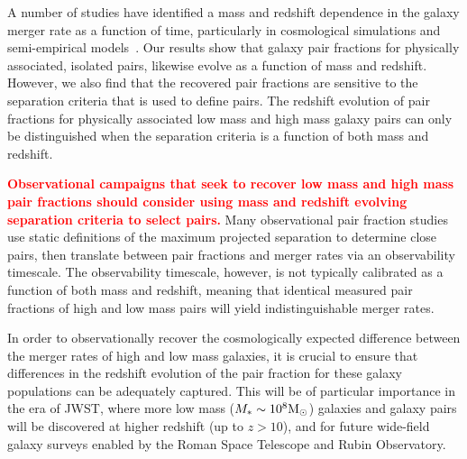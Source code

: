 \documentclass[linenumbers,twocolumn]{aastex631}
\newcommand{\add}[1]{\textcolor{red}{\textbf{#1}}}
\begin{document}
    A number of studies have identified a mass and redshift dependence in the galaxy merger rate as a function of time, particularly in cosmological simulations and semi-empirical models~\cite[see e.g.][]{Stewart2009,Hopkins2010,RG2015}. 
    Our results show that galaxy pair fractions for physically associated, isolated pairs, likewise evolve as a function of mass and redshift. 
    However, we also find that the recovered pair fractions are sensitive to the separation criteria that is used to define pairs.
    The redshift evolution of pair fractions for physically associated low mass and high mass galaxy pairs can only be distinguished when the separation criteria is a function of both mass and redshift.

    \add{Observational campaigns that seek to recover low mass and high mass pair fractions should consider using mass and redshift evolving separation criteria to select pairs.}
    Many observational pair fraction studies use static definitions of the maximum projected separation to determine close pairs, then translate between pair fractions and merger rates via an observability timescale. 
    The observability timescale, however, is not typically calibrated as a function of both mass and redshift, meaning that identical measured pair fractions of high and low mass pairs will yield indistinguishable merger rates. 
    
    In order to observationally recover the cosmologically expected difference between the merger rates of high and low mass galaxies, it is crucial to ensure that differences in the redshift evolution of the pair fraction for these galaxy populations can be adequately captured. 
    This will be of particular importance in the era of JWST, where more low mass ($M_*\sim10^8 \mathrm{M}_\odot$) galaxies and galaxy pairs will be discovered at higher redshift (up to $z>10$), and for future wide-field galaxy surveys enabled by the Roman Space Telescope and Rubin Observatory. 


\end{document}

